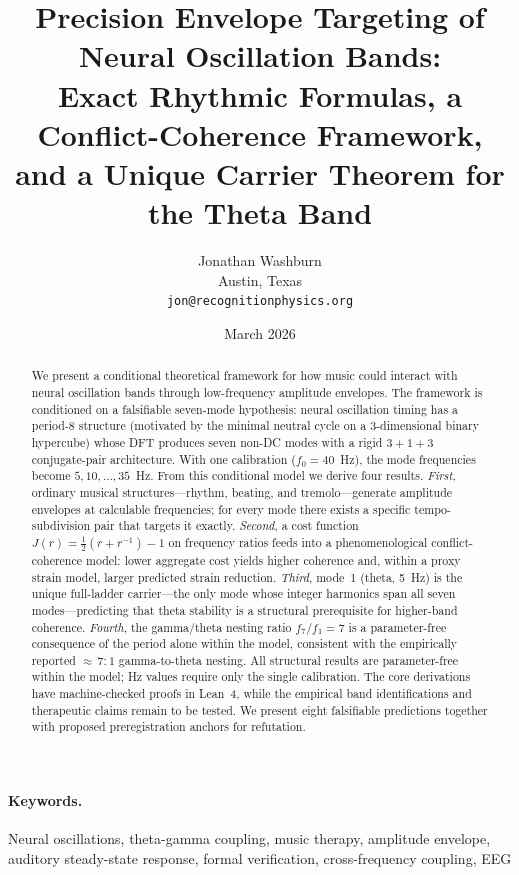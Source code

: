 \documentclass[11pt,a4paper]{article}
\title{Precision Envelope Targeting of Neural Oscillation Bands:\\
Exact Rhythmic Formulas, a Conflict-Coherence Framework,\\
and a Unique Carrier Theorem for the Theta Band}
\author{Jonathan Washburn\\
Austin, Texas\\
\texttt{jon@recognitionphysics.org}}
\date{March 2026}
\begin{document}
\maketitle

\begin{abstract}
We present a conditional theoretical framework for how music could
interact with neural oscillation bands through low-frequency amplitude
envelopes. The framework is conditioned on a falsifiable seven-mode
hypothesis: neural
oscillation timing has a period-8 structure (motivated by the minimal
neutral cycle on a 3-dimensional binary hypercube) whose DFT produces
seven non-DC modes with a rigid $3{+}1{+}3$ conjugate-pair architecture.
With one calibration ($f_0 = 40$~Hz), the mode frequencies become
$5, 10, \ldots, 35$~Hz. From this conditional model we derive four
results.
\emph{First}, ordinary musical structures---rhythm, beating, and
tremolo---generate amplitude envelopes at calculable frequencies; for
every mode there exists a specific tempo-subdivision pair that targets
it exactly.
\emph{Second}, a cost function $J(r)=\tfrac{1}{2}(r+r^{-1})-1$
on frequency ratios feeds into a phenomenological conflict-coherence
model: lower aggregate cost yields higher coherence and, within a proxy
strain model, larger predicted strain reduction.
\emph{Third}, mode~1 (theta, 5~Hz) is the unique full-ladder
carrier---the only mode whose integer harmonics span all seven
modes---predicting that theta stability is a structural prerequisite
for higher-band coherence.
\emph{Fourth}, the gamma/theta nesting ratio $f_7/f_1 = 7$ is a
parameter-free consequence of the period alone within the model,
consistent with the empirically reported ${\approx}\,7{:}1$
gamma-to-theta nesting. All structural results are parameter-free
within the model; Hz values require only the single calibration. The
core derivations have machine-checked proofs in Lean~4, while the
empirical band identifications and therapeutic claims remain to be
tested. We present eight falsifiable predictions together with proposed
preregistration anchors for refutation.
\end{abstract}

\paragraph{Keywords.} Neural oscillations, theta-gamma coupling, music
therapy, amplitude envelope, auditory steady-state response, formal
verification, cross-frequency coupling, EEG

\end{document}
